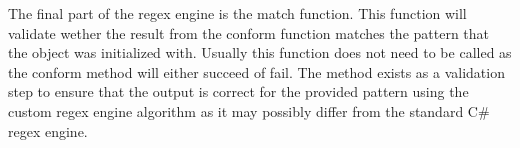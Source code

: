 The final part of the regex engine is the match function. This function will validate wether the result from the conform function matches the pattern that the object was initialized with. Usually this function does not need to be called as the conform method will either succeed of fail. The method exists as a validation step to ensure that the output is correct for the provided pattern using the custom regex engine algorithm as it may possibly differ from the standard C\# regex engine.
